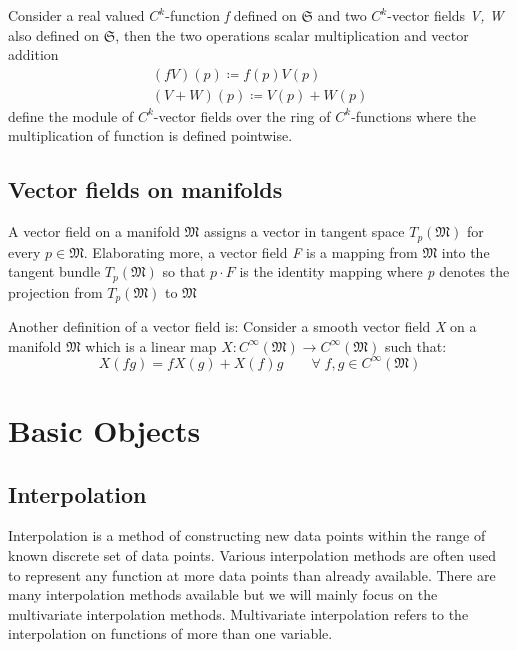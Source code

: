 Consider a real valued $C^{k} $-function \textit{f} defined on $\mathfrak{S} $ and two $C^{k} $-vector fields \textit{V, W} also defined on $\mathfrak{S} $, then the two operations scalar multiplication and vector addition
\begin{equation}
\begin{split}
	(fV)(p) \coloneqq f(p)V(p) \\
	(V+W)(p) \coloneqq V(p) + W(p)
\end{split}
\end{equation}
define the module of $C^{k} $-vector fields over the ring of $C^{k} $-functions where the multiplication of function is defined pointwise.

\subsection{Vector fields on manifolds}
A vector field on a manifold $ \mathfrak{M} $ assigns a vector in tangent space $ T_{p}( \mathfrak{M})  $ for every $ p \in \mathfrak{M} $. Elaborating more, a vector field \textit{F} is a mapping from $ \mathfrak{M} $ into the tangent bundle $ T_{p}( \mathfrak{M})  $ so that $ p \cdot F $ is the identity mapping where \textit{p} denotes the projection from $T_{p}( \mathfrak{M}) $ to $\mathfrak{M}$ 

Another definition of a vector field is: Consider a smooth vector field \textit{X} on a manifold $ \mathfrak{M} $ which is a linear map $ X: C^{\infty}(\mathfrak{M}) \rightarrow C^{\infty}(\mathfrak{M})  $ such that:
\begin{equation}
	X(fg) = fX(g) + X(f)g  \qquad \forall \; f, g\in C^{\infty}(\mathfrak{M})
\end{equation}

\section{Basic Objects}

\subsection{Interpolation}
Interpolation is a method of constructing new data points within the range of known discrete set of data points. Various interpolation methods are often used to represent any function at more data points than already available. There are many interpolation methods available but we will mainly focus on the multivariate interpolation methods. Multivariate interpolation refers to the interpolation on functions of more than one variable. 

